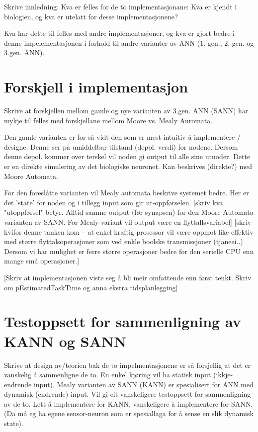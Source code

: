 %
%
%
%
%






Skrive innledning: Kva er felles for de to implementasjonane: Kva er kjendt i biologien, og kva er utelatt for desse implementasjonene?

Kva har dette til felles med andre implementasjoner, og kva er gjort bedre i denne impelementasjonen i forhold til andre varianter av ANN (1. gen., 2. gen. og 3.gen. ANN).

\section{Forskjell i implementasjon}
Skrive at forskjellen mellom gamle og nye varianten av 3.gen. ANN (SANN) har mykje til felles med forskjellane mellom Moore vs. Mealy Auromata.

Den gamle varianten er for så vidt den som er mest intuitiv å implementere / designe. Denne ser på umiddelbar tilstand (depol. verdi) for nodene. Dersom denne depol. kommer over terskel vil noden gi output til alle sine utnoder.
Dette er en direkte simulering av det biologiske neuronet. Kan beskrives (direkte?) med Moore Automata.

For den foreslåtte varianten vil Mealy automata beskrive systemet bedre. Her er det 'state' for noden og i tillegg input som gir ut-oppførselen.
[skriv kva "utoppførsel" betyr. Alltid samme output (før synapsen) for den Moore-Automata varianten av SANN. For Mealy variant vil output være en flyttallsvariabel]
[skriv kvifor denne tanken kom -- at enkel kraftig prosessor vil være oppmot like effektiv med større flyttalsoperasjoner som ved enkle boolske transmissjoner (tjaneei..)
Dersom vi har mulighet er ferre større operasjoner bedre for den serielle CPU enn mange små operasjoner.]

[Skriv at implementasjonen viste seg å bli meir omfattende enn først tenkt. Skriv om pEstimatedTaskTime og anna ekstra tidsplanlegging]




\section{Testoppsett for sammenligning av KANN og SANN}
Skrive at design av/teorien bak  de to impelmentasjonene er så forsjellig at det er vanskelig å sammenligne de to. En enkel kjøring vil ha statisk input (ikkje-endrende input).
Mealy varianten av SANN (KANN) er spesialisert for ANN med dynamisk (endrende) input. Vil gi eit vanskeligere testoppsett for sammenligning av de to. Lett å implementere for KANN, vanskeligere å implementere for SANN.
(Da må eg ha egene sensor-neuron som er spesiallaga for å sense en slik dynamisk state).

